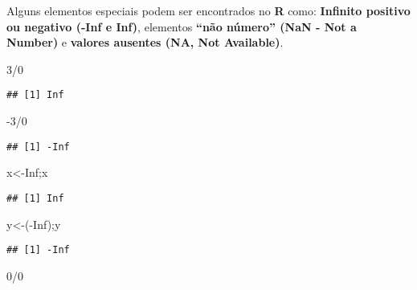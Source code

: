 \documentclass[
]{book}
\newenvironment{Shaded}{\begin{snugshade}}{\end{snugshade}}
\newcommand{\ConstantTok}[1]{\textcolor[rgb]{0.00,0.00,0.00}{#1}}
\newcommand{\DecValTok}[1]{\textcolor[rgb]{0.00,0.00,0.81}{#1}}
\newcommand{\NormalTok}[1]{#1}
\newcommand{\OtherTok}[1]{\textcolor[rgb]{0.56,0.35,0.01}{#1}}
\newcommand{\SpecialCharTok}[1]{\textcolor[rgb]{0.00,0.00,0.00}{#1}}
\begin{document}
Alguns elementos especiais podem ser encontrados no \textbf{R} como: \textbf{Infinito positivo ou negativo (-Inf e Inf)}, elementos \textbf{``não número'' (NaN - Not a Number)} e \textbf{valores ausentes (NA, Not Available)}.

\begin{Shaded}
\begin{Highlighting}[]
\DecValTok{3}\SpecialCharTok{/}\DecValTok{0}
\end{Highlighting}
\end{Shaded}

\begin{verbatim}
## [1] Inf
\end{verbatim}

\begin{Shaded}
\begin{Highlighting}[]
\SpecialCharTok{{-}}\DecValTok{3}\SpecialCharTok{/}\DecValTok{0}
\end{Highlighting}
\end{Shaded}

\begin{verbatim}
## [1] -Inf
\end{verbatim}

\begin{Shaded}
\begin{Highlighting}[]
\NormalTok{x}\OtherTok{\textless{}{-}}\ConstantTok{Inf}\NormalTok{;x}
\end{Highlighting}
\end{Shaded}

\begin{verbatim}
## [1] Inf
\end{verbatim}

\begin{Shaded}
\begin{Highlighting}[]
\NormalTok{y}\OtherTok{\textless{}{-}}\NormalTok{(}\SpecialCharTok{{-}}\ConstantTok{Inf}\NormalTok{);y}
\end{Highlighting}
\end{Shaded}

\begin{verbatim}
## [1] -Inf
\end{verbatim}

\begin{Shaded}
\begin{Highlighting}[]
\DecValTok{0}\SpecialCharTok{/}\DecValTok{0}
\end{Highlighting}
\end{Shaded}
\end{document}
